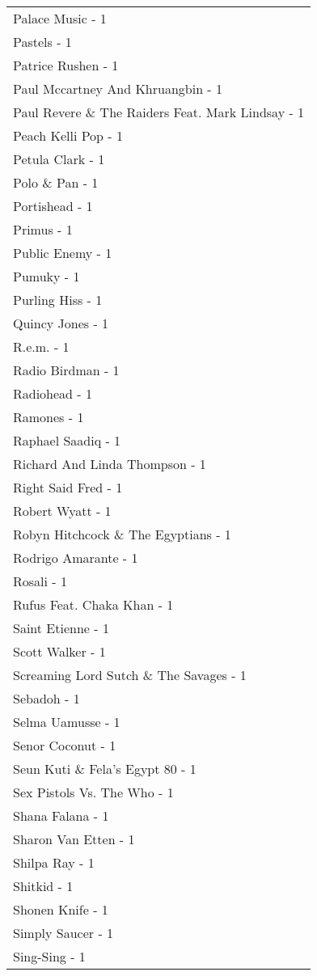 \documentclass[
]{article}
\begin{document}
\begin{longtable}{l}
Palace Music - 1 \\ 
Pastels - 1 \\ 
Patrice Rushen - 1 \\ 
Paul Mccartney And Khruangbin - 1 \\ 
Paul Revere \& The Raiders Feat. Mark Lindsay - 1 \\ 
Peach Kelli Pop - 1 \\ 
Petula Clark - 1 \\ 
Polo \& Pan - 1 \\ 
Portishead - 1 \\ 
Primus - 1 \\ 
Public Enemy - 1 \\ 
Pumuky - 1 \\ 
Purling Hiss - 1 \\ 
Quincy Jones - 1 \\ 
R.e.m. - 1 \\ 
Radio Birdman - 1 \\ 
Radiohead - 1 \\ 
Ramones - 1 \\ 
Raphael Saadiq - 1 \\ 
Richard And Linda Thompson - 1 \\ 
Right Said Fred - 1 \\ 
Robert Wyatt - 1 \\ 
Robyn Hitchcock \& The Egyptians - 1 \\ 
Rodrigo Amarante - 1 \\ 
Rosali - 1 \\ 
Rufus Feat. Chaka Khan - 1 \\ 
Saint Etienne - 1 \\ 
Scott Walker - 1 \\ 
Screaming Lord Sutch \& The Savages - 1 \\ 
Sebadoh - 1 \\ 
Selma Uamusse - 1 \\ 
Senor Coconut - 1 \\ 
Seun Kuti \& Fela's Egypt 80 - 1 \\ 
Sex Pistols Vs. The Who - 1 \\ 
Shana Falana - 1 \\ 
Sharon Van Etten - 1 \\ 
Shilpa Ray - 1 \\ 
Shitkid - 1 \\ 
Shonen Knife - 1 \\ 
Simply Saucer - 1 \\ 
Sing-Sing - 1 \\ 

\end{longtable}
\end{document}
